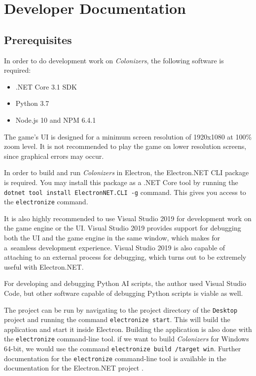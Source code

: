 \section{Developer Documentation}
\label{sec:devdocs} 

\subsection{Prerequisites}

In order to do development work on \emph{Colonizers}, the following software
is required:
\begin{itemize}
    \item .NET Core 3.1 SDK
    \item Python 3.7
    \item Node.js 10 and NPM 6.4.1
\end{itemize}
The game's UI is designed for a minimum screen resolution of 1920x1080 at
100\% zoom level. It is not recommended to play the game on lower resolution
screens, since graphical errors may occur.

In order to build and run \emph{Colonizers} in Electron, the Electron.NET CLI
package is required. You may install this package as a .NET Core tool by running
the \texttt{dotnet tool install ElectronNET.CLI -g} command. This gives you
access to the \texttt{electronize} command.

It is also highly recommended to use Visual Studio 2019 for development work
on the game engine or the UI. Visual Studio 2019 provides support for debugging
both the UI and the game engine in the same window, which makes for a~seamless
development experience. Visual Studio 2019 is also capable of attaching
to an external process for debugging, which turns out to be
extremely useful with Electron.NET.

For developing and debugging Python AI scripts, the author used Visual Studio Code,
but other software capable of debugging Python scripts is viable as well.

The project can be run by navigating to the project directory of the \texttt{Desktop} project
and running the command \texttt{electronize start}. This will build the application
and start it inside Electron. Building the application is also done with the
\texttt{electronize} command-line tool. if we want to build \emph{Colonizers}
for Windows 64-bit, we would use the command \texttt{electronize build /target win}.
Further documentation for the \texttt{electronize} command-line tool
is available in the documentation for the Electron.NET project \cite{Electronnet}.

